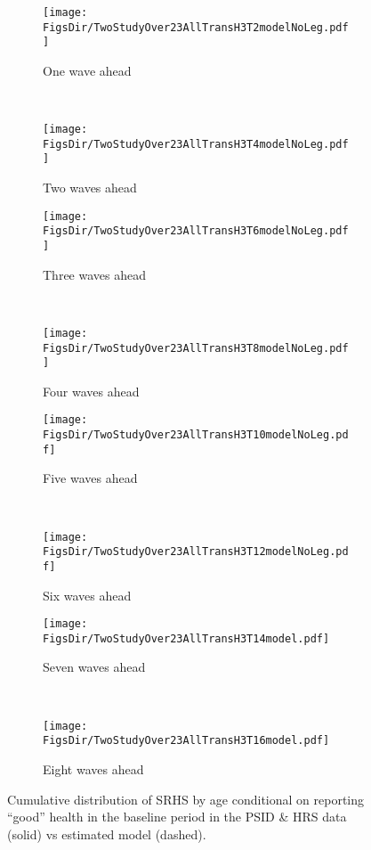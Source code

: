 \documentclass[12pt,pdftex,letterpaper]{article}
\newcommand{\RootDir}{..}
\newcommand{\FigsDir}{\RootDir/Figures}
\begin{document}
\begin{figure}
	\centering
	\begin{subfigure}[b]{0.48\textwidth}
		\texttt{[image: \\FigsDir/TwoStudyOver23AllTransH3T2modelNoLeg.pdf]}
		\caption{One wave ahead}\label{fig:Model1AheadGood}
	\end{subfigure}
	~
	\begin{subfigure}[b]{0.48\textwidth}
		\texttt{[image: \\FigsDir/TwoStudyOver23AllTransH3T4modelNoLeg.pdf]}
		\caption{Two waves ahead}\label{fig:Model2AheadGood}
	\end{subfigure}
	
	\begin{subfigure}[b]{0.48\textwidth}
		\texttt{[image: \\FigsDir/TwoStudyOver23AllTransH3T6modelNoLeg.pdf]}
		\caption{Three waves ahead}\label{fig:Model3AheadGood}
	\end{subfigure}
	~
	\begin{subfigure}[b]{0.48\textwidth}
		\texttt{[image: \\FigsDir/TwoStudyOver23AllTransH3T8modelNoLeg.pdf]}
		\caption{Four waves ahead}\label{fig:Model4AheadGood}
	\end{subfigure}
	
	\begin{subfigure}[b]{0.48\textwidth}
		\texttt{[image: \\FigsDir/TwoStudyOver23AllTransH3T10modelNoLeg.pdf]}
		\caption{Five waves ahead}\label{fig:Model5AheadGood}
	\end{subfigure}
	~
	\begin{subfigure}[b]{0.48\textwidth}
		\texttt{[image: \\FigsDir/TwoStudyOver23AllTransH3T12modelNoLeg.pdf]}
		\caption{Six waves ahead}\label{fig:Model6AheadGood}
	\end{subfigure}
	
	\begin{subfigure}[b]{0.48\textwidth}
		\texttt{[image: \\FigsDir/TwoStudyOver23AllTransH3T14model.pdf]}
		\caption{Seven waves ahead}\label{fig:Model7AheadGood}
	\end{subfigure}
	~
	\begin{subfigure}[b]{0.48\textwidth}
		\texttt{[image: \\FigsDir/TwoStudyOver23AllTransH3T16model.pdf]}
		\caption{Eight waves ahead}\label{fig:Model8AheadGood}
	\end{subfigure}
	\caption{Cumulative distribution of SRHS by age conditional on reporting ``good'' health in the baseline period in the PSID \& HRS data (solid) vs estimated model (dashed).}\label{fig:ModelTransGD}
\end{figure}
\end{document}
